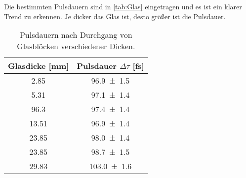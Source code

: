     Die bestimmten Pulsdauern sind in \autoref{tab:Glas} eingetragen und es ist ein klarer Trend zu erkennen.
    Je dicker das Glas ist, desto größer ist die Pulsdauer.
    \begin{table}[h]
        \centering
        \caption{Pulsdauern nach Durchgang von Glasblöcken verschiedener Dicken.}
        \label{tab:Glas}
        \begin{tabular}{c c}
        \toprule
        {Glasdicke [mm]} & {Pulsdauer $\Delta \tau$ [fs]}  \\
        \midrule
        \num{2.85}     &   \num{96,9\pm1,5}  \\
        \num{5.31}     &   \num{97,1\pm1,4}  \\
        \num{96,3}     &   \num{97,4\pm1,4}  \\
        \num{13,51}    &   \num{96,9\pm1,4}  \\
        \num{23,85}    &   \num{98,0\pm1,4}  \\
        \num{23,85}    &   \num{98,7\pm1,5}  \\
        \num{29,83}    &   \num{103,0\pm1,6} \\
        \bottomrule
        \end{tabular}
    \end{table}





